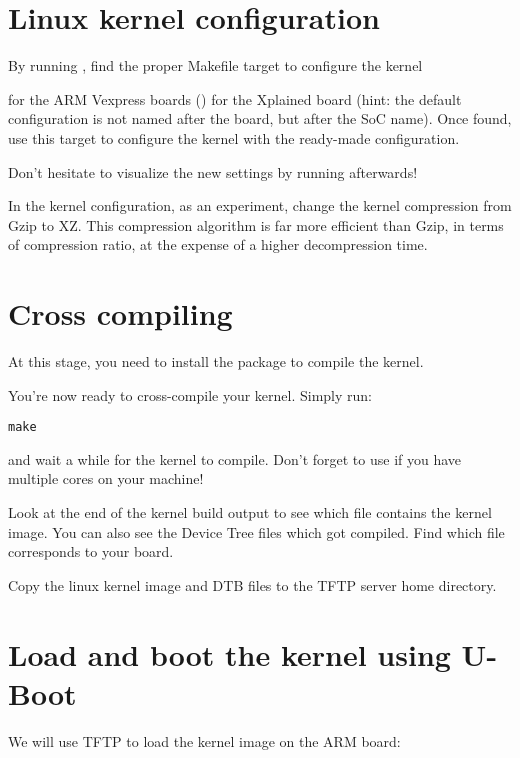 \section{Linux kernel configuration}

By running , find the proper Makefile target to
configure the kernel

{for the ARM Vexpress boards ()}
{for the Xplained board (hint: the default
configuration is not named after the board, but after the SoC
name). Once found, use this target to configure the kernel with the
ready-made configuration.}

Don't hesitate to visualize the new settings by running
 afterwards!

In the kernel configuration, as an experiment, change the kernel
compression from Gzip to XZ. This compression algorithm is far more
efficient than Gzip, in terms of compression ratio, at the expense of
a higher decompression time.

\section{Cross compiling}

At this stage, you need to install the 
package to compile the kernel.

You're now ready to cross-compile your kernel. Simply run:

\begin{verbatim}
make
\end{verbatim}

and wait a while for the kernel to compile. Don't forget to use
 if you have multiple cores on your machine!

Look at the end of the kernel build output to see which file contains
the kernel image. You can also see the Device Tree  files
which got compiled. Find which  file corresponds to your
board.

Copy the linux kernel image and DTB files to the TFTP server
home directory.

\section{Load and boot the kernel using U-Boot}

We will use TFTP to load the kernel image on the ARM board:

